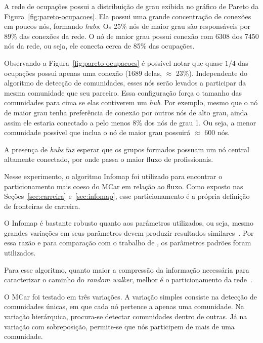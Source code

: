 \documentclass[
  article,
  11pt,
  a4paper,
  english,
  brazil,
  sumario=tradicional]{abntex2}
\begin{document}
A rede de ocupações possui a distribuição de grau exibida no gráfico de Pareto da Figura~\ref{fig:pareto-ocupacoes}. Ela possui uma grande concentração de conexões em poucos nós, formando \textit{hubs}. Os 25\% nós de maior grau são responsáveis por 89\% das conexões da rede. O nó de maior grau possui conexão com 6308 dos 7450 nós da rede, ou seja, ele conecta cerca de 85\% das ocupações.

Observando a Figura~\ref{fig:pareto-ocupacoes} é possível notar que quase $1/4$ das ocupações possui apenas uma conexão (1689 delas, $\approx$ 23\%). Independente do algoritmo de detecção de comunidades, esses nós serão levados a participar da mesma comunidade que seu parceiro. Essa configuração força o tamanho das comunidades para cima se elas contiverem um \textit{hub}. Por exemplo, mesmo que o nó de maior grau tenha preferência de conexão por outros nós de alto grau, ainda assim ele estaria conectado a pelo menos 8\% dos nós de grau 1. Ou seja, a menor comunidade possível que inclua o nó de maior grau possuirá $\approx$ 600 nós.

A presença de \textit{hubs} faz esperar que os grupos formados possuam um nó central altamente conectado, por onde passa o maior fluxo de profissionais.


Nesse experimento, o algoritmo Infomap foi utilizado para encontrar o particionamento mais coeso do MCar em relação ao fluxo. Como exposto nas Seções~\ref{sec:carreira} e~\ref{sec:infomap}, esse particionamento é a própria definição de fronteiras de carreira.

O Infomap é bastante robusto quanto aos parâmetros utilizados, ou seja, mesmo grandes variações em seus parâmetros devem produzir resultados similares~\cite{Kawamoto2015-ha,Lambiotte2012-fp}. Por essa razão e para comparação com o trabalho de , os parâmetros padrões foram utilizados.

Para esse algoritmo, quanto maior a compressão da informação necessária para caracterizar o caminho do \textit{random walker}, melhor é o particionamento da rede~\cite{Rosvall2009-sd}.

O MCar foi testado em três variações. A variação simples consiste na detecção de comunidades únicas, em que cada nó pertence a apenas uma comunidade. Na variação hierárquica, procura-se detectar comunidades dentro de outras. Já na variação com sobreposição, permite-se que nós participem de mais de uma comunidade.
\end{document}
